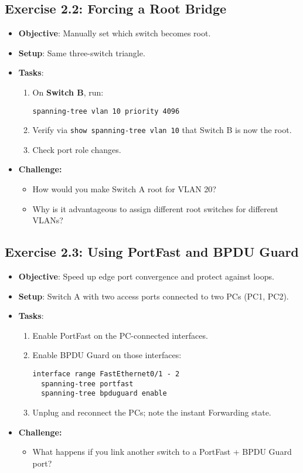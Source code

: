 \documentclass[a4paper]{report}
\begin{document}
\subsection*{Exercise 2.2: Forcing a Root Bridge}
\begin{itemize}
  \item \textbf{Objective}: Manually set which switch becomes root.
  \item \textbf{Setup}: Same three-switch triangle.
  \item \textbf{Tasks}:
  \begin{enumerate}
    \item On \textbf{Switch B}, run:
\begin{lstlisting}
spanning-tree vlan 10 priority 4096
\end{lstlisting}
    \item Verify via \texttt{show spanning-tree vlan 10} that Switch B is now the root.
    \item Check port role changes.
  \end{enumerate}

\item \textbf{Challenge:}
\begin{itemize}
  \item How would you make Switch A root for VLAN 20?
  \item Why is it advantageous to assign different root switches for different VLANs?
\end{itemize}
\end{itemize}
\subsection*{Exercise 2.3: Using PortFast and BPDU Guard}
\begin{itemize}
  \item \textbf{Objective}: Speed up edge port convergence and protect against loops.
  \item \textbf{Setup}: Switch A with two access ports connected to two PCs (PC1, PC2).
  \item \textbf{Tasks}:
  \begin{enumerate}
    \item Enable PortFast on the PC-connected interfaces.
    \item Enable BPDU Guard on those interfaces:
\begin{lstlisting}
interface range FastEthernet0/1 - 2
  spanning-tree portfast
  spanning-tree bpduguard enable
\end{lstlisting}
    \item Unplug and reconnect the PCs; note the instant Forwarding state.
  \end{enumerate}

\item \textbf{Challenge:}
\begin{itemize}
  \item What happens if you link another switch to a PortFast + BPDU Guard port?
\end{itemize}
\end{itemize}
\end{document}
